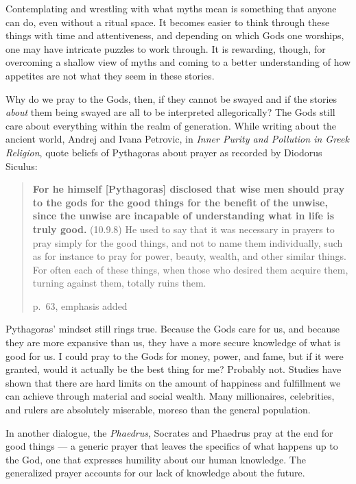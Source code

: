 \documentclass[
]{book}
\begin{document}
Contemplating and wrestling with what myths mean is something that anyone can do, even without a ritual space. It becomes easier to think through these things with time and attentiveness, and depending on which Gods one worships, one may have intricate puzzles to work through. It is rewarding, though, for overcoming a shallow view of myths and coming to a better understanding of how appetites are not what they seem in these stories.

Why do we pray to the Gods, then, if they cannot be swayed and if the stories \emph{about} them being swayed are all to be interpreted allegorically? The Gods still care about everything within the realm of generation. While writing about the ancient world, Andrej and Ivana Petrovic, in \emph{Inner Purity and Pollution in Greek Religion}, quote beliefs of Pythagoras about prayer as recorded by Diodorus Siculus:

\begin{quote}
\textbf{For he himself {[}Pythagoras{]} disclosed that wise men should pray to the gods for the good things for the benefit of the unwise, since the unwise are incapable of understanding what in life is truly good.} (10.9.8) He used to say that it was necessary in prayers to pray simply for the good things, and not to name them individually, such as for instance to pray for power, beauty, wealth, and other similar things. For often each of these things, when those who desired them acquire them, turning against them, totally ruins them.

p.~63, emphasis added
\end{quote}

Pythagoras' mindset still rings true. Because the Gods care for us, and because they are more expansive than us, they have a more secure knowledge of what is good for us. I could pray to the Gods for money, power, and fame, but if it were granted, would it actually be the best thing for me? Probably not. Studies have shown that there are hard limits on the amount of happiness and fulfillment we can achieve through material and social wealth. Many millionaires, celebrities, and rulers are absolutely miserable, moreso than the general population.

In another dialogue, the \emph{Phaedrus}, Socrates and Phaedrus pray at the end for good things --- a generic prayer that leaves the specifics of what happens up to the God, one that expresses humility about our human knowledge. The generalized prayer accounts for our lack of knowledge about the future.
\end{document}
